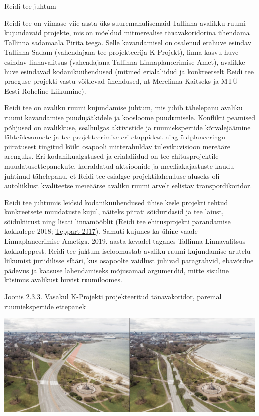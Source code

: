 \documentclass[estonian,]{article}
\begin{document}
Reidi tee juhtum

Reidi tee on viimase viie aasta üks suuremahulisemaid Tallinna avalikku ruumi kujundavaid projekte, mis on mõeldud mitmerealise tänavakoridorina ühendama Tallinna sadamaala Pirita teega. Selle kavandamisel on osalenud erahuve esindav Tallinna Sadam (vahendajana tee projekteerija K-Projekt), linna kasvu huve esindav linnavalitsus (vahendajana Tallinna Linnaplaneerimise Amet), avalikke huve esindavad kodanikuühendused (mitmed erialaliidud ja konkreetselt Reidi tee praeguse projekti vastu võitlevad ühendused, nt Merelinna Kaitseks ja MTÜ Eesti Roheline Liikumine).

Reidi tee on avaliku ruumi kujundamise juhtum, mis juhib tähelepanu avaliku ruumi kavandamise puudujääkidele ja koosloome puudumisele. Konflikti peamised põhjused on avalikkuse, sealhulgas aktivistide ja ruumiekspertide kõrvalejäämine lähteülesannete ja tee projekteerimise eri etappidest ning üldplaneeringu piiratusest tingitud kõiki osapooli mitterahuldav tulevikuvisioon mereääre arenguks. Eri kodanikualgatused ja erialaliidud on tee ehitusprojektile muudatusettepanekute, korraldatud aktsioonide ja meediakajastuste kaudu juhtinud tähelepanu, et Reidi tee esialgse projektilahenduse aluseks oli autoliiklust kvaliteetse mereäärse avaliku ruumi arvelt eelistav transpordikoridor.

Reidi tee juhtumis leidsid kodanikuühendused ühise keele projekti tehtud konkreetsete muudatuste kujul, näiteks piirati sõiduridasid ja tee laiust, sõidukiirust ning lisati linnamööblit (Reidi tee ehitusprojekti parandamise kokkulepe 2018; \protect\hyperlink{Teppart2017}{Teppart 2017}). Samuti kujunes ka ühine vaade Linnaplaneerimise Ametiga. 2019. aasta kevadel taganes Tallinna Linnavalitsus kokkuleppest. Reidi tee juhtum iseloomustab avaliku ruumi kujundamise arutelu liikumist juriidilisse sfääri, kus osapoolte vaidlust juhivad paragrahvid, ebavõrdne pädevus ja kaasuse lahendamiseks mõjusamad argumendid, mitte sisuline küsimus avalikust huvist ruumiloomes.

{Joonis 2.3.3.} Vasakul K-Projekti projekteeritud tänavakoridor, paremal ruumiekspertide ettepanek

\begin{center}\includegraphics[width=0.8\linewidth]{figures/2-chapter/fig233} \end{center}
\end{document}
